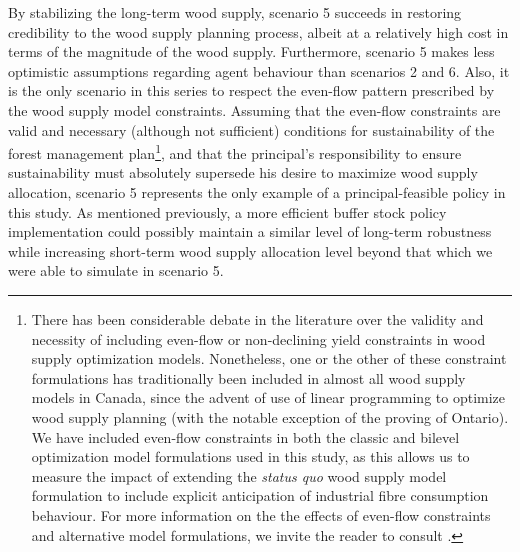 By stabilizing the long-term wood supply, scenario 5 succeeds in restoring credibility to the wood supply planning process, albeit at a relatively high cost in terms of the magnitude of the wood supply. Furthermore, scenario 5 makes less optimistic assumptions regarding agent behaviour than scenarios 2 and 6. Also, it is the only scenario in this series to respect the even-flow pattern prescribed by the wood supply model constraints.  Assuming that the even-flow constraints are valid and necessary (although not sufficient) conditions for sustainability of the forest management plan\footnote{There has been considerable debate in the literature over the validity and necessity of including even-flow or non-declining yield constraints in wood supply optimization models. Nonetheless, one or the other of these constraint formulations has traditionally been included in almost all wood supply models in Canada, since the advent of use of linear programming to optimize wood supply planning (with the notable exception of the proving of Ontario). We have included even-flow constraints in both the classic and bilevel optimization model formulations used in this study, as this allows us to measure the impact of extending the \emph{status quo} wood supply model formulation to include explicit anticipation of industrial fibre consumption behaviour. For more information on the the effects of even-flow constraints and alternative model formulations, we invite the reader to consult \citet{luckert2005should}.}, and that the principal's responsibility to ensure sustainability must absolutely supersede his desire to maximize wood supply allocation, scenario 5 represents the only example of a principal-feasible policy in this study. As mentioned previously, a more efficient buffer stock policy implementation could possibly maintain a similar level of long-term robustness while increasing short-term wood supply allocation level beyond that which we were able to simulate in scenario 5.


